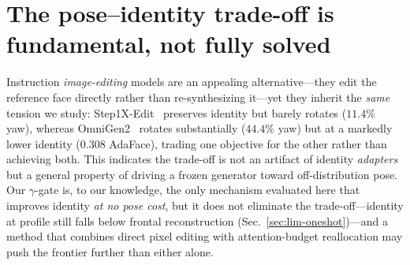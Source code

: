 \section{The pose--identity trade-off is fundamental, not fully solved}
\label{sec:lim-tradeoff}
Instruction \emph{image-editing} models are an appealing alternative---they edit
the reference face directly rather than re-synthesizing it---yet they inherit the
\emph{same} tension we study: Step1X-Edit~\cite{step1xedit} preserves identity but
barely rotates ($11.4\%$ yaw), whereas OmniGen2~\cite{omnigen2} rotates
substantially ($44.4\%$ yaw) but at a markedly lower identity ($0.308$ AdaFace),
trading one objective for the other rather than achieving both. This indicates the
trade-off is not an artifact of identity \emph{adapters} but a general property of
driving a frozen generator toward off-distribution pose. Our $\gamma$-gate is, to
our knowledge, the only mechanism evaluated here that improves identity \emph{at no
pose cost}, but it does not eliminate the trade-off---identity at profile still
falls below frontal reconstruction (Sec.~\ref{sec:lim-oneshot})---and a method that
combines direct pixel editing with attention-budget reallocation may push the
frontier further than either alone.

